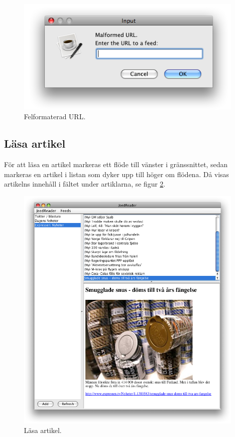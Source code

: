 \documentclass[titlepage, twoside, a4paper, 12pt]{article}
\begin{document}
\begin{figure}[!hbp]
  \begin{center}
    \includegraphics[width=110mm]{images/malformed-url.png}
    \caption{Felformaterad URL.}
    \label{fig:malformed-url}
  \end{center}
\end{figure}

\subsection{Läsa artikel}
För att läsa en artikel markeras ett flöde till vänster i
gränssnittet, sedan markeras en artikel i listan som dyker upp till
höger om flödena. Då visas artikelns innehåll i fältet under
artiklarna, se figur \ref{fig:read-item-out}.

\begin{figure}[!hbp]
  \begin{center}
    \includegraphics[width=110mm]{images/read-item-out.png}
    \caption{Läsa artikel.}
    \label{fig:read-item-out}
  \end{center}
\end{figure}
\end{document}
